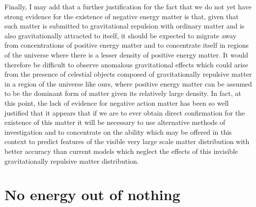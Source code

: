 \documentclass[notitlepage,12pt]{report}
\begin{document}
Finally, I may add that a further justification for the fact that we do not yet have strong evidence for the existence of negative energy matter is that, given that such matter is submitted to gravitational repulsion with ordinary matter and is also gravitationally attracted to itself, it should be expected to migrate away from concentrations of positive energy matter and to concentrate itself in regions of the universe where there is a lesser density of positive energy matter. It would therefore be difficult to observe anomalous gravitational effects which could arise from the presence of celestial objects composed of gravitationally repulsive matter in a region of the universe like ours, where positive energy matter can be assumed to be the dominant form of matter given its relatively large density. In fact, at this point, the lack of evidence for negative action matter has been so well justified that it appears that if we are to ever obtain direct confirmation for the existence of this matter it will be necessary to use alternative methods of investigation and to concentrate on the ability which may be offered in this context to predict features of the visible very large scale matter distribution with better accuracy than current models which neglect the effects of this invisible gravitationally repulsive matter distribution.

\section{No energy out of nothing}
\end{document}
